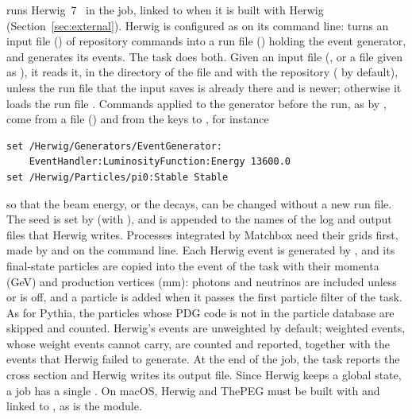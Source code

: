  runs Herwig~7~\cite{Bellm:2015jjp} in the job, linked to \Datum{} when it is built with
Herwig (Section~\ref{sec:external}). Herwig is configured as on its command line:  turns an input
file () of repository commands into a run file () holding the event generator, and  generates its events. The task does both. Given an input file (, or a  file given as
), it reads it, in the directory of the file and with the repository 
( by default), unless the run file that the input saves is already there and is newer;
otherwise it loads the run file . Commands applied to the generator before the run, as by , come from a file () and from the keys  to , for instance
{\small
\begin{verbatim}
set /Herwig/Generators/EventGenerator:
    EventHandler:LuminosityFunction:Energy 13600.0
set /Herwig/Particles/pi0:Stable Stable
\end{verbatim}
}
so that the beam energy, or the decays, can be changed without a new run file. The seed is set by 
(with ), and  is appended to the names of the log and output files that Herwig writes.
Processes integrated by Matchbox need their grids first, made by  and  on
the command line. Each Herwig event is generated by , and its final-state particles are copied into
the event of the task with their momenta (GeV) and production vertices (mm): photons and neutrinos are included unless
 or  is off, and a particle is added when it passes the first particle filter of
the task. As for Pythia, the particles whose PDG code is not in the particle database are skipped and counted.
Herwig's events are unweighted by default; weighted events, whose weight \Datum{} events cannot carry, are counted and
reported, together with the events that Herwig failed to generate. At the end of the job, the task reports the cross
section and Herwig writes its output file. Since Herwig keeps a global state, a job has a single
. On macOS, Herwig and ThePEG must be built with  and linked
to , as is the \Datum{} module.

